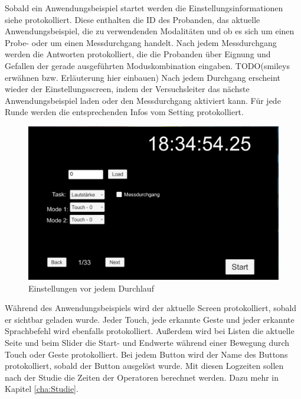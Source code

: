 Sobald ein Anwendungsbeispiel startet werden die Einstellungsinformationen siehe  protokolliert. 
Diese enthalten die ID des Probanden, das aktuelle Anwendungsbeispiel, die zu verwendenden Modalitäten und ob es sich um einen Probe- oder um einen Messdurchgang handelt. 
Nach jedem Messdurchgang werden die Antworten protokolliert, die die Probanden über Eignung und Gefallen der gerade ausgeführten Moduskombination eingaben. TODO(smileys erwähnen bzw. Erläuterung hier einbauen)
Nach jedem Durchgang erscheint wieder der Einstellungsscreen, indem der Versuchsleiter das nächste Anwendungsbeispiel laden oder den Messdurchgang aktiviert kann. 
Für jede Runde werden die entsprechenden Infos vom Setting protokolliert.
\begin{figure}[ht]
  \centering
  \includegraphics[width=1\textwidth]{img/SettingsPrototyp.jpg}
  \caption{Einstellungen vor jedem Durchlauf}
  \label{fig:ProbandenSettings}
\end{figure} 

Während des Anwendungsbeispiels wird der aktuelle Screen protokolliert, sobald er sichtbar geladen wurde. 
Jeder Touch, jede erkannte Geste und jeder erkannte Sprachbefehl wird ebenfalls protokolliert. 
Außerdem wird bei Listen die aktuelle Seite und beim Slider die Start- und Endwerte während einer Bewegung durch Touch oder Geste protokolliert. 
Bei jedem Button wird der Name des Buttons protokolliert, sobald der Button ausgelöst wurde. 
Mit diesen Logzeiten sollen nach der Studie die Zeiten der Operatoren berechnet werden. 
Dazu mehr in Kapitel \ref{cha:Studie}.  

